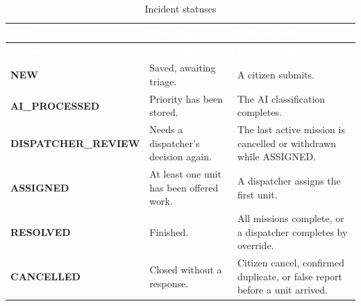 {\tabfont\rowband
\begin{longtable}{@{}>{\raggedright\arraybackslash}p{}>{\raggedright\arraybackslash}p{}>{\raggedright\arraybackslash}p{}@{}}
\caption{Incident statuses}\label{tab:incident-states}\\
\rowcolor{najdanavy}\textcolor{white}{\sffamily\bfseries\small Status} & \textcolor{white}{\sffamily\bfseries\small Meaning} & \textcolor{white}{\sffamily\bfseries\small Entered when}\\
\endfirsthead
\rowcolor{najdanavy}\textcolor{white}{\sffamily\bfseries\small Status} & \textcolor{white}{\sffamily\bfseries\small Meaning} & \textcolor{white}{\sffamily\bfseries\small Entered when}\\
\endhead
\bottomrule\endlastfoot
\textbf{NEW} & Saved, awaiting triage. & A citizen submits.\\
\textbf{AI\_\allowbreak{}PROCESSED} & Priority has been stored. & The AI classification completes.\\
\textbf{DISPATCHER\_\allowbreak{}REVIEW} & Needs a dispatcher’s decision again. & The last active mission is cancelled or withdrawn while ASSIGNED.\\
\textbf{ASSIGNED} & At least one unit has been offered work. & A dispatcher assigns the first unit.\\
\textbf{RESOLVED} & Finished. & All missions complete, or a dispatcher completes by override.\\
\textbf{CANCELLED} & Closed without a response. & Citizen cancel, confirmed duplicate, or false report before a unit arrived.\\
\end{longtable}}
